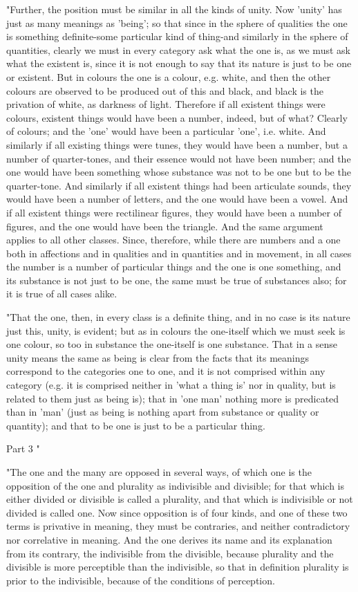 "Further, the position must be similar in all the kinds of unity.
Now 'unity' has just as many meanings as 'being'; so that since in
the sphere of qualities the one is something definite-some particular
kind of thing-and similarly in the sphere of quantities, clearly we
must in every category ask what the one is, as we must ask what the
existent is, since it is not enough to say that its nature is just
to be one or existent. But in colours the one is a colour, e.g. white,
and then the other colours are observed to be produced out of this
and black, and black is the privation of white, as darkness of light.
Therefore if all existent things were colours, existent things would
have been a number, indeed, but of what? Clearly of colours; and the
'one' would have been a particular 'one', i.e. white. And similarly
if all existing things were tunes, they would have been a number,
but a number of quarter-tones, and their essence would not have been
number; and the one would have been something whose substance was
not to be one but to be the quarter-tone. And similarly if all existent
things had been articulate sounds, they would have been a number of
letters, and the one would have been a vowel. And if all existent
things were rectilinear figures, they would have been a number of
figures, and the one would have been the triangle. And the same argument
applies to all other classes. Since, therefore, while there are numbers
and a one both in affections and in qualities and in quantities and
in movement, in all cases the number is a number of particular things
and the one is one something, and its substance is not just to be
one, the same must be true of substances also; for it is true of all
cases alike. 

"That the one, then, in every class is a definite thing, and in no
case is its nature just this, unity, is evident; but as in colours
the one-itself which we must seek is one colour, so too in substance
the one-itself is one substance. That in a sense unity means the same
as being is clear from the facts that its meanings correspond to the
categories one to one, and it is not comprised within any category
(e.g. it is comprised neither in 'what a thing is' nor in quality,
but is related to them just as being is); that in 'one man' nothing
more is predicated than in 'man' (just as being is nothing apart from
substance or quality or quantity); and that to be one is just to be
a particular thing. 

Part 3 "

"The one and the many are opposed in several ways, of which one is
the opposition of the one and plurality as indivisible and divisible;
for that which is either divided or divisible is called a plurality,
and that which is indivisible or not divided is called one. Now since
opposition is of four kinds, and one of these two terms is privative
in meaning, they must be contraries, and neither contradictory nor
correlative in meaning. And the one derives its name and its explanation
from its contrary, the indivisible from the divisible, because plurality
and the divisible is more perceptible than the indivisible, so that
in definition plurality is prior to the indivisible, because of the
conditions of perception. 

